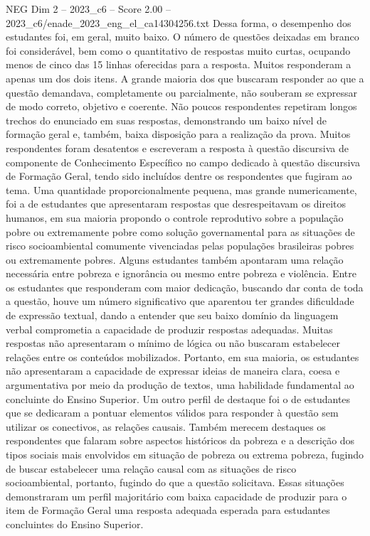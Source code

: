 \begin{textsample}{NEG Dim 2 – 2023\_c6 – Score 2.00 – 2023\_c6/enade\_2023\_eng\_el\_ca14304256.txt}
Dessa forma, o desempenho dos estudantes foi, em geral, muito baixo.
O número de questões deixadas em branco foi considerável, bem como o quantitativo de respostas muito curtas, ocupando menos de cinco das 15 linhas oferecidas para a resposta.
Muitos responderam a apenas um dos dois itens.
A grande maioria dos que buscaram responder ao que a questão demandava, completamente ou parcialmente, não souberam se expressar de modo correto, objetivo e coerente.
Não poucos respondentes repetiram longos trechos do enunciado em suas respostas, demonstrando um baixo nível de formação geral e, também, baixa disposição para a realização da prova.
Muitos respondentes foram desatentos e escreveram a resposta à questão discursiva de componente de Conhecimento Específico no campo dedicado à questão discursiva de Formação Geral, tendo sido incluídos dentre os respondentes que fugiram ao tema.
Uma quantidade proporcionalmente pequena, mas grande numericamente, foi a de estudantes que apresentaram respostas que desrespeitavam os direitos humanos, em sua maioria propondo o controle reprodutivo sobre a população pobre ou extremamente pobre como solução governamental para as situações de risco socioambiental comumente vivenciadas pelas populações brasileiras pobres ou extremamente pobres.
Alguns estudantes também apontaram uma relação necessária entre pobreza e ignorância ou mesmo entre pobreza e violência.
Entre os estudantes que responderam com maior dedicação, buscando dar conta de toda a questão, houve um número significativo que aparentou ter grandes dificuldade de expressão textual, dando a entender que seu baixo domínio da linguagem verbal comprometia a capacidade de produzir respostas adequadas.
Muitas respostas não apresentaram o mínimo de lógica ou não buscaram estabelecer relações entre os conteúdos mobilizados.
Portanto, em sua maioria, os estudantes não apresentaram a capacidade de expressar ideias de maneira clara, coesa e argumentativa por meio da produção de textos, uma habilidade fundamental ao concluinte do Ensino Superior.
Um outro perfil de destaque foi o de estudantes que se dedicaram a pontuar elementos válidos para responder à questão sem utilizar os conectivos, as relações causais.
Também merecem destaques os respondentes que falaram sobre aspectos históricos da pobreza e a descrição dos tipos sociais mais envolvidos em situação de pobreza ou extrema pobreza, fugindo de buscar estabelecer uma relação causal com as situações de risco socioambiental, portanto, fugindo do que a questão solicitava.
Essas situações demonstraram um perfil majoritário com baixa capacidade de produzir para o item de Formação Geral uma resposta adequada esperada para estudantes concluintes do Ensino Superior.

\end{textsample}
